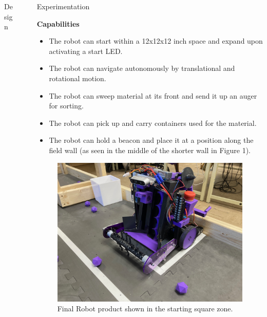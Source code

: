 \documentclass[final]{beamer}
\newlength{\sepwidth}
\newlength{\colwidth}
\newcommand{\separatorcolumn}{\begin{column}{\sepwidth}\end{column}}
\begin{document}
\begin{frame}[t]
\begin{columns}[t]
\begin{column}{\colwidth}
\begin{block}{Design}
  \end{block}

\end{column}

\separatorcolumn

\begin{column}{\colwidth}

    \begin{block}{Experimentation}
    \item \textbf{Capabilities}
        \begin{itemize}
          \item The robot can start within a 12x12x12 inch space and expand upon activating a start LED.
          \item The robot can navigate autonomously by translational and rotational motion.
          \item The robot can sweep material at its front and send it up an auger for sorting.
          \item The robot can pick up and carry containers used for the material.
          \item The robot can hold a beacon and place it at a position along the field wall (as seen in the middle of the shorter wall in Figure 1).
        \end{itemize}

    \begin{figure}
      \centering
      \includegraphics[width=20.0cm]{Robot_Practice_Field.jpg}
      \caption{Final Robot product shown in the starting square zone.}
    \end{figure}


\end{block}
\end{column}
\end{columns}
\end{frame}
\end{document}
